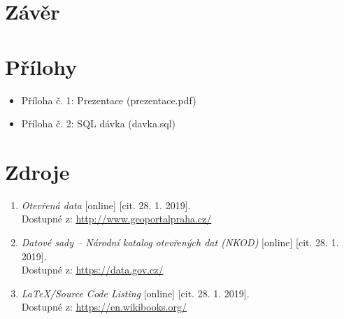 \documentclass[a4paper, 12pt]{article}
\begin{document}
\clearpage

\section{Závěr}


\clearpage

\section{Přílohy} 

\begin{itemize}
\item Příloha č. 1: Prezentace (prezentace.pdf)
\item Příloha č. 2: SQL dávka (davka.sql)
\end{itemize}

\clearpage

\section{Zdroje}
\begin{enumerate}
\item  \textsl{Otevřená data} [online] [cit. 28. 1. 2019].\\
Dostupné z: \href{http://www.geoportalpraha.cz/cs/opendata?fbclid=IwAR3dvAz20d2Anu-nuD9A7wC3byHUKTzDGTnlgQrmi0tC-t-SbSqN7Q5x-sA#.XE8ymWlCfIX}{http://www.geoportalpraha.cz/}

\item  \textsl{Datové sady – Národní katalog otevřených dat (NKOD)} [online] [cit. 28. 1. 2019].\\
Dostupné z: \href{https://data.gov.cz/datov\%C3\%A9-sady?dotaz=&fbclid=IwAR2jg2NvnsjO7BuHAgbXSJwh6VXFbsuXs0FONcle5ZfdPpO86Z_2C3YUQsU}{https://data.gov.cz/}

\item  \textsl{LaTeX/Source Code Listing} [online] [cit. 28. 1. 2019].\\
Dostupné z: \href{https://en.wikibooks.org/wiki/LaTeX/Source_Code_Listings}{https://en.wikibooks.org/}

\end{enumerate}
\end{document}
